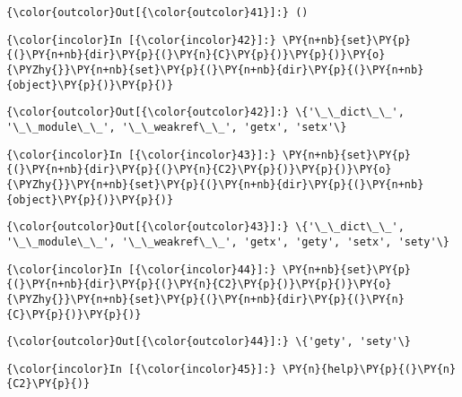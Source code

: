             \begin{Verbatim}[commandchars=\\\{\}]
{\color{outcolor}Out[{\color{outcolor}41}]:} ()
\end{Verbatim}
        
    \begin{Verbatim}[commandchars=\\\{\}]
{\color{incolor}In [{\color{incolor}42}]:} \PY{n+nb}{set}\PY{p}{(}\PY{n+nb}{dir}\PY{p}{(}\PY{n}{C}\PY{p}{)}\PY{p}{)}\PY{o}{\PYZhy{}}\PY{n+nb}{set}\PY{p}{(}\PY{n+nb}{dir}\PY{p}{(}\PY{n+nb}{object}\PY{p}{)}\PY{p}{)}
\end{Verbatim}

            \begin{Verbatim}[commandchars=\\\{\}]
{\color{outcolor}Out[{\color{outcolor}42}]:} \{'\_\_dict\_\_', '\_\_module\_\_', '\_\_weakref\_\_', 'getx', 'setx'\}
\end{Verbatim}
        
    \begin{Verbatim}[commandchars=\\\{\}]
{\color{incolor}In [{\color{incolor}43}]:} \PY{n+nb}{set}\PY{p}{(}\PY{n+nb}{dir}\PY{p}{(}\PY{n}{C2}\PY{p}{)}\PY{p}{)}\PY{o}{\PYZhy{}}\PY{n+nb}{set}\PY{p}{(}\PY{n+nb}{dir}\PY{p}{(}\PY{n+nb}{object}\PY{p}{)}\PY{p}{)}
\end{Verbatim}

            \begin{Verbatim}[commandchars=\\\{\}]
{\color{outcolor}Out[{\color{outcolor}43}]:} \{'\_\_dict\_\_', '\_\_module\_\_', '\_\_weakref\_\_', 'getx', 'gety', 'setx', 'sety'\}
\end{Verbatim}
        
    \begin{Verbatim}[commandchars=\\\{\}]
{\color{incolor}In [{\color{incolor}44}]:} \PY{n+nb}{set}\PY{p}{(}\PY{n+nb}{dir}\PY{p}{(}\PY{n}{C2}\PY{p}{)}\PY{p}{)}\PY{o}{\PYZhy{}}\PY{n+nb}{set}\PY{p}{(}\PY{n+nb}{dir}\PY{p}{(}\PY{n}{C}\PY{p}{)}\PY{p}{)}
\end{Verbatim}

            \begin{Verbatim}[commandchars=\\\{\}]
{\color{outcolor}Out[{\color{outcolor}44}]:} \{'gety', 'sety'\}
\end{Verbatim}
        
    \begin{Verbatim}[commandchars=\\\{\}]
{\color{incolor}In [{\color{incolor}45}]:} \PY{n}{help}\PY{p}{(}\PY{n}{C2}\PY{p}{)}
\end{Verbatim}


